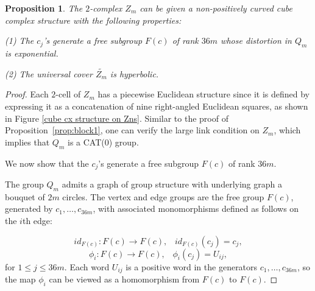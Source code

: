 \documentclass[oneside,11pt,reqno]{amsart}
\newtheorem{prop}[thm]{Proposition}
\theoremstyle{definition}
\begin{document}
\begin{prop}\label{prop:block2}
The $2$-complex $Z_m$ can be given a non-positively curved cube complex structure with the following properties:

(1) The $c_j$'s generate a free subgroup $F(c)$ of rank $36m$ whose distortion in $Q_m$ is exponential.


(2) The universal cover $\widetilde{Z_m}$ is hyperbolic.

\end{prop}

\begin{proof}

Each $2$-cell of $Z_m$ has a piecewise Euclidean structure since it is defined by expressing it as a concatenation of nine right-angled Euclidean squares, as shown in Figure \ref{cube cx structure on Zns}. Similar to the proof of Proposition~\ref{prop:block1}, 
one can verify the large link condition on $Z_m$, which implies that $Q_m$ is a CAT($0$) group.

We now show that the $c_j$'s generate a free subgroup $F(c)$ of rank $36m$. 


The group $Q_m$ admits a graph of group structure with underlying graph a bouquet of $2m$ circles. The vertex and edge groups are the free group $F(c)$, generated by $c_1, \ldots, c_{36m}$, with associated monomorphisms defined as follows on the $i$th edge:

$$id_{F(c)} : F(c) \rightarrow F(c), \hspace{10pt} id_{F(c)}(c_j)=c_j,$$
$$\phi_i : F(c) \rightarrow F(c), \hspace{10pt}  \phi_i(c_j)=U_{ij},$$
for $1 \leq j \leq 36m$. Each word $U_{ij}$ is a positive word in the generators $c_1, \ldots, c_{36m}$, so the map $\phi_i$ can be viewed as a homomorphism from $F(c)$ to $F(c)$.





\end{proof}
\end{document}
